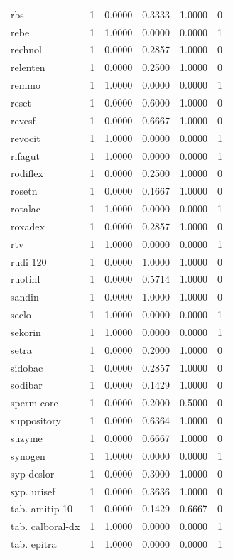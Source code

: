 \begin{longtable}{p{3.0cm}rrrrr}
rbs & 1 & 0.0000 & 0.3333 & 1.0000 & 0 \\
rebe & 1 & 1.0000 & 0.0000 & 0.0000 & 1 \\
rechnol & 1 & 0.0000 & 0.2857 & 1.0000 & 0 \\
relenten & 1 & 0.0000 & 0.2500 & 1.0000 & 0 \\
remmo & 1 & 1.0000 & 0.0000 & 0.0000 & 1 \\
reset & 1 & 0.0000 & 0.6000 & 1.0000 & 0 \\
revesf & 1 & 0.0000 & 0.6667 & 1.0000 & 0 \\
revocit & 1 & 1.0000 & 0.0000 & 0.0000 & 1 \\
rifagut & 1 & 1.0000 & 0.0000 & 0.0000 & 1 \\
rodiflex & 1 & 0.0000 & 0.2500 & 1.0000 & 0 \\
rosetn & 1 & 0.0000 & 0.1667 & 1.0000 & 0 \\
rotalac & 1 & 1.0000 & 0.0000 & 0.0000 & 1 \\
roxadex & 1 & 0.0000 & 0.2857 & 1.0000 & 0 \\
rtv & 1 & 1.0000 & 0.0000 & 0.0000 & 1 \\
rudi 120 & 1 & 0.0000 & 1.0000 & 1.0000 & 0 \\
ruotinl & 1 & 0.0000 & 0.5714 & 1.0000 & 0 \\
sandin & 1 & 0.0000 & 1.0000 & 1.0000 & 0 \\
seclo & 1 & 1.0000 & 0.0000 & 0.0000 & 1 \\
sekorin & 1 & 1.0000 & 0.0000 & 0.0000 & 1 \\
setra & 1 & 0.0000 & 0.2000 & 1.0000 & 0 \\
sidobac & 1 & 0.0000 & 0.2857 & 1.0000 & 0 \\
sodibar & 1 & 0.0000 & 0.1429 & 1.0000 & 0 \\
sperm core & 1 & 0.0000 & 0.2000 & 0.5000 & 0 \\
suppository & 1 & 0.0000 & 0.6364 & 1.0000 & 0 \\
suzyme & 1 & 0.0000 & 0.6667 & 1.0000 & 0 \\
synogen & 1 & 1.0000 & 0.0000 & 0.0000 & 1 \\
syp deslor & 1 & 0.0000 & 0.3000 & 1.0000 & 0 \\
syp. urisef & 1 & 0.0000 & 0.3636 & 1.0000 & 0 \\
tab. amitip 10 & 1 & 0.0000 & 0.1429 & 0.6667 & 0 \\
tab. calboral-dx & 1 & 1.0000 & 0.0000 & 0.0000 & 1 \\
tab. epitra & 1 & 1.0000 & 0.0000 & 0.0000 & 1 \\

\end{longtable}
